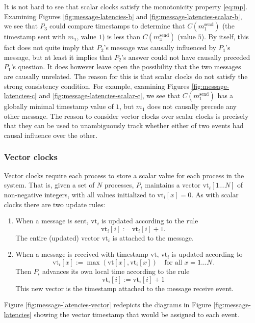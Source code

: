 \documentclass[]             %
{NASA}                       %
\theoremstyle{definition}
\begin{document}
\afterpage{\clearpage}

It is not hard to see that scalar clocks satisfy the monotonicity
property \ref{eq:mp}. Examining Figures \ref{fig:message-latencies-b}
and \ref{fig:message-latencies-scalar-b}, we see that $P_3$ could
compare timestamps to determine that $C(m_1^\textrm{send})$ (the
timestamp sent with $m_1$, value $1$) is less than
$C(m_4^\textrm{send})$ (value $5$). By itself, this fact does not
quite imply that $P_2$'s message was causally influenced by $P_1$'s
message, but at least it implies that $P_2$'s answer could not have
causally preceded $P_1$'s question. It does however leave open the
possibility that the two messages are causally unrelated. The reason
for this is that scalar clocks do not satisfy the strong consistency
condition. For example, examining Figures
\ref{fig:message-latencies-c} and
\ref{fig:message-latencies-scalar-c}, we see that
$C(m_1^\textrm{send})$ has a globally minimal timestamp value of $1$,
but $m_1$ does not causally precede any other message. The reason to
consider vector clocks over scalar clocks is precisely that they can
be used to unambiguously track whether either of two events had causal
influence over the other.

\subsubsection{Vector clocks}
\newcommand{\vt}{\textrm{vt}}
Vector clocks require each process to store a scalar value for each
process in the system. That is, given a set of $N$ processes, $P_i$
maintains a vector $\vt_i[1 \ldots N]$ of non-negative
integers, with all values initialized to $\vt_i[x] = 0$. As
with scalar clocks there are two update rules:
\begin{enumerate}
\item When a message is sent, $\vt_i$ is updated according to the rule
  \[\vt_i[i] := \vt_i[i] + 1.\]
  The entire (updated) vector $\vt_i$ is attached to the message.
\item When a message is received with timestamp $\vt$, $\vt_i$ is updated according to
  \[\vt_i[x] := \max(\vt[x], \vt_i[x]) \quad \textrm{for all $x = 1\ldots N$}.\]
  Then $P_i$ advances its own local time according to the rule
  \[ \vt_i[i] := \vt_i[i] + 1\]
  This new vector is the timestamp attached to the message receive event.
\end{enumerate}
Figure \ref{fig:message-latencies-vector} redepicts the diagrams in
Figure \ref{fig:message-latencies} showing the vector timestamp that
would be assigned to each event.
\end{document}
